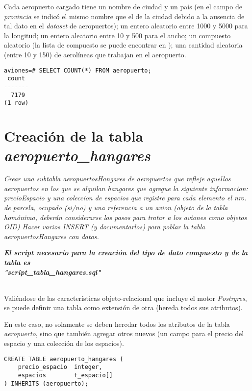 Cada aeropuerto cargado tiene un nombre de ciudad y un país (en el campo de \emph{provincia} se indicó el mismo nombre que el de la ciudad debido a la ausencia de tal dato en el \emph{dataset} de aeropuertos); un entero aleatorio entre 1000 y 5000 para la longitud; un entero aleatorio entre 10 y 500 para el ancho; un compuesto aleatorio (la lista de compuesto se puede encontrar en \autocite{compuestos}); una cantidad aleatoria (entre 10 y 150) de aerolíneas que trabajan en el aeropuerto.

\vspace*{5mm}
\lstset{style=sql}
\begin{lstlisting}
aviones=# SELECT COUNT(*) FROM aeropuerto;
 count 
-------
  7179
(1 row)
\end{lstlisting}

\section{Creación de la tabla \emph{aeropuerto\_hangares}}

\emph{Crear una subtabla aeropuertosHangares de aeropuertos que refleje aquellos aeropuertos en los que se alquilan hangares que agregue la siguiente informacion: precioEspacio y una coleccion de espacios que registre para cada elemento el nro. de parcela, ocupado (si/no) y una referencia a un avion (objeto de la tabla homónima, deberán considerarse los pasos para tratar a los aviones como objetos OID) Hacer varios INSERT (y documentarlos) para poblar la tabla aeropuertosHangares con datos.} 

\emph{\textbf{El script necesario para la creación del tipo de dato compuesto y de la tabla es \\ "script\_tabla\_hangares.sql"}} 

~\\


Valiéndose de las características objeto-relacional que incluye el motor \emph{Postrgres}, se puede definir una tabla como extensión de otra (hereda todos sus atributos).

En este caso, no solamente se deben heredar todos los atributos de la tabla \emph{aeropuerto}, sino que también agregar otros nuevos (un campo para el precio del espacio y una colección de los espacios). 

\vspace*{5mm}
\lstset{style=sql}
\begin{lstlisting}
CREATE TABLE aeropuerto_hangares (
    precio_espacio  integer,
    espacios        t_espacio[]
) INHERITS (aeropuerto);
\end{lstlisting}

